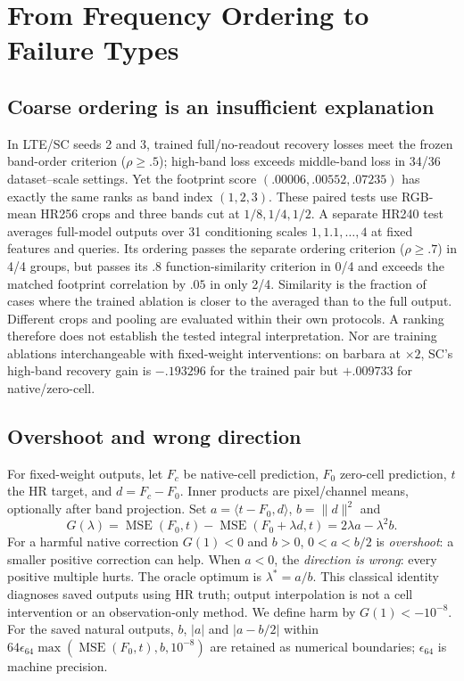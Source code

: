 \section{From Frequency Ordering to Failure Types}
\label{sec:failure}
\subsection{Coarse ordering is an insufficient explanation}
In LTE/SC seeds 2 and 3, trained full/no-readout recovery
losses meet the frozen band-order criterion ($\rho\ge.5$); high-band loss
exceeds middle-band loss in 34/36 dataset--scale settings. Yet the
footprint score $(.00006,.00552,.07235)$ has exactly the same ranks as
band index $(1,2,3)$. These paired tests use RGB-mean HR256 crops and
three bands cut at $1/8,1/4,1/2$. A separate HR240 test averages full-model
outputs over 31 conditioning scales $1,1.1,\ldots,4$ at fixed features
and queries. Its ordering passes the separate ordering criterion
($\rho\ge.7$) in 4/4 groups, but passes its $.8$ function-similarity
criterion in 0/4 and exceeds the matched footprint correlation by $.05$
in only 2/4. Similarity is the fraction of cases where the trained
ablation is closer to the averaged than to the full output. Different
crops and pooling are evaluated within their own protocols. A ranking
therefore does not establish the tested integral
interpretation. Nor are training ablations interchangeable with fixed-weight
interventions: on barbara at $\times2$, SC's high-band recovery gain is
$-.193296$ for the trained pair but $+.009733$ for native/zero-cell.

\subsection{Overshoot and wrong direction}
For fixed-weight outputs, let $F_c$ be native-cell prediction, $F_0$
zero-cell prediction, $t$ the HR target, and $d=F_c-F_0$. Inner products
are pixel/channel means, optionally after band projection. Set
$a=\langle t-F_0,d\rangle$, $b=\|d\|^2$ and
\begin{equation}
 G(\lambda)=\operatorname{MSE}(F_0,t)-\operatorname{MSE}(F_0+\lambda d,t)
             =2\lambda a-\lambda^2b.
 \label{eq:gain}
\end{equation}
For a harmful native correction $G(1)<0$ and $b>0$, $0<a<b/2$ is
\emph{overshoot}: a smaller positive correction can help. When $a<0$,
the \emph{direction is wrong}: every positive multiple hurts. The oracle
optimum is $\lambda^*=a/b$. This classical identity diagnoses saved
outputs using HR truth; output interpolation is not a cell intervention
or an observation-only method. We define harm by $G(1)<-10^{-8}$. For the saved natural outputs,
$b$, $|a|$ and $|a-b/2|$ within
$64\epsilon_{64}\max(\operatorname{MSE}(F_0,t),b,10^{-8})$
are retained as numerical boundaries; $\epsilon_{64}$ is machine precision.

